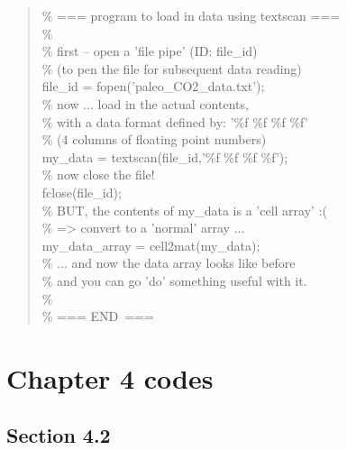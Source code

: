 \documentclass{tufte-book} %
\newenvironment{docspec}{\begin{quotation}\ttfamily\parskip0pt\parindent0pt\ignorespaces}{\end{quotation}}
\begin{document}
\begin{docspec}
\textcolor[rgb]{0,0.501961,0}{\% === program to load in data using textscan ===}\\
\textcolor[rgb]{0,0.501961,0}{\%}\\
\textcolor[rgb]{0,0.501961,0}{\% first -- open a 'file pipe' (ID: file\_id)\\
\% (to pen the file for subsequent data reading)}\\
file\_id = fopen(\textcolor[rgb]{1,0,1}{'paleo\_CO2\_data.txt'});\\
\textcolor[rgb]{0,0.501961,0}{\% now ... load in the actual contents,\\
\% with a data format defined by: '\%f \%f \%f \%f'\\
\% (4 columns of floating point numbers)}\\
my\_data = textscan(file\_id,\textcolor[rgb]{1,0,1}{'\%f \%f \%f \%f'});\\
\textcolor[rgb]{0,0.501961,0}{\% now close the file!}\\
fclose(file\_id);\\
\textcolor[rgb]{0,0.501961,0}{\% BUT, the contents of my\_data is a 'cell array' :(\\
\% => convert to a 'normal' array ...}\\
my\_data\_array = cell2mat(my\_data);\\
\textcolor[rgb]{0,0.501961,0}{\% ... and now the data array looks like before\\
\% and you can go 'do' something useful with it.}\\
\textcolor[rgb]{0,0.501961,0}{\%}\\
\textcolor[rgb]{0,0.501961,0}{\% === END\ ===}\\
\end{docspec}

%
\newpage


\section{Chapter 4 codes}


\subsection*{\textbf{Section 4.2}}
\end{document}
